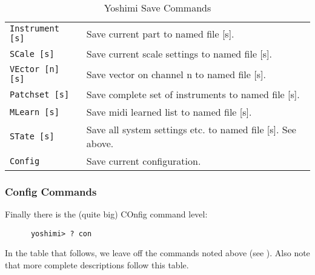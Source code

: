    \begin{table}[H]
      \centering
      \caption{Yoshimi Save Commands}
      \label{table:yoshimi_text_loadsave_commands}
      \begin{tabular}{l l}

\texttt{Instrument [s]} &
   Save current part to named file [s]. \\
\texttt{SCale [s]} &
   Save current scale settings to named file [s]. \\
\texttt{VEctor [n] [s]} &
   Save vector on channel n to named file [s]. \\
\texttt{Patchset [s]} &
   Save complete set of instruments to named file [s]. \\
\texttt{MLearn [s]} &
   Save midi learned list to named file [s]. \\
\texttt{STate [s]} &
   Save all system settings etc. to named file [s].  See above. \\
\texttt{Config} &
   Save current configuration. \\

      \end{tabular}
   \end{table}

\subsubsection{Config Commands}
\label{subsec:command_line_config_list}

   Finally there is the (quite big) COnfig command level:

   \begin{verbatim}
      yoshimi> ? con
   \end{verbatim}

   In the table that follows, we leave off the commands noted above
   (see ).  Also
   note that more complete descriptions follow this table.

